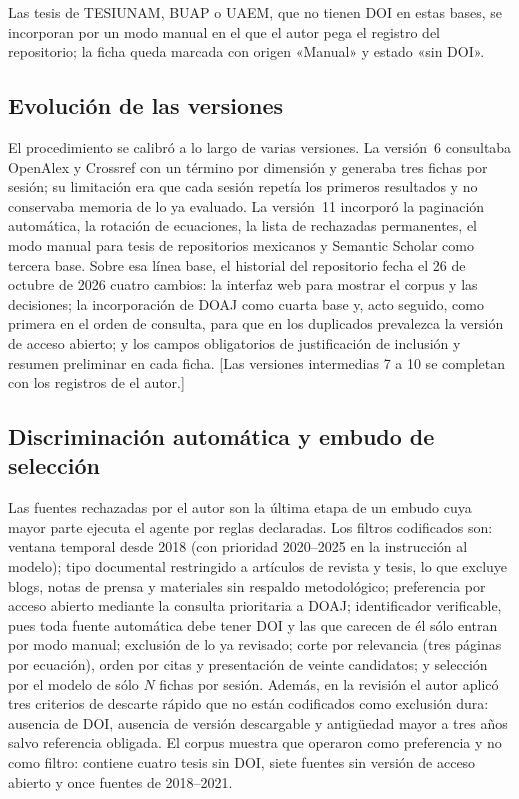 Las tesis de TESIUNAM, BUAP o UAEM, que no tienen DOI en estas bases, se
incorporan por un modo manual en el que el autor pega el registro del
repositorio; la ficha queda marcada con origen «Manual» y estado «sin DOI».

\subsection{Evolución de las versiones}

El procedimiento se calibró a lo largo de varias versiones. La versión~6
consultaba OpenAlex y Crossref con un término por dimensión y generaba tres
fichas por sesión; su limitación era que cada sesión repetía los primeros
resultados y no conservaba memoria de lo ya evaluado. La versión~11 incorporó
la paginación automática, la rotación de ecuaciones, la lista de rechazadas
permanentes, el modo manual para tesis de repositorios mexicanos y Semantic
Scholar como tercera base. Sobre esa línea base, el historial del
repositorio fecha el 26 de octubre de 2026 cuatro cambios: la interfaz web
para mostrar el corpus y las decisiones; la incorporación de DOAJ como
cuarta base y, acto seguido, como primera en el orden de consulta, para que
en los duplicados prevalezca la versión de acceso abierto; y los campos
obligatorios de justificación de inclusión y resumen preliminar en cada
ficha. [Las versiones intermedias 7 a 10 se completan con los registros de
el autor.]

\subsection{Discriminación automática y embudo de selección}

Las fuentes rechazadas por el autor son la última etapa de un embudo cuya
mayor parte ejecuta el agente por reglas declaradas. Los filtros codificados
son: ventana temporal desde 2018 (con prioridad 2020--2025 en la instrucción
al modelo); tipo documental restringido a artículos de revista y tesis, lo
que excluye blogs, notas de prensa y materiales sin respaldo metodológico;
preferencia por acceso abierto mediante la consulta prioritaria a DOAJ;
identificador verificable, pues toda fuente automática debe tener DOI y las
que carecen de él sólo entran por modo manual; exclusión de lo ya revisado;
corte por relevancia (tres páginas por ecuación), orden por citas y
presentación de veinte candidatos; y selección por el modelo de sólo $N$
fichas por sesión. Además, en la revisión el autor aplicó tres criterios de
descarte rápido que no están codificados como exclusión dura: ausencia de
DOI, ausencia de versión descargable y antigüedad mayor a tres años salvo
referencia obligada. El corpus muestra que operaron como preferencia y no
como filtro: contiene cuatro tesis sin DOI, siete fuentes sin versión de
acceso abierto y once fuentes de 2018--2021.

